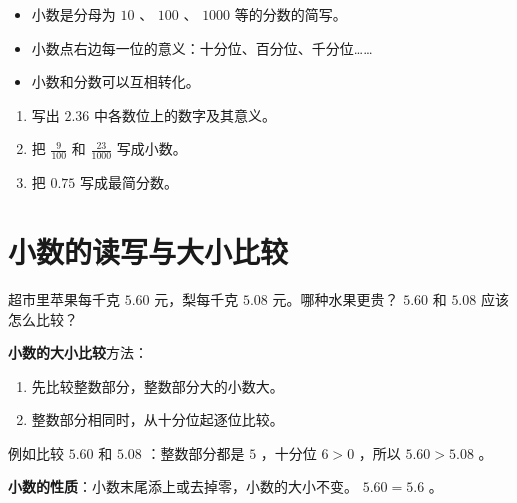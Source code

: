 \begin{keytakeaway}


\begin{itemize}
  \item 小数是分母为 $10$ 、 $100$ 、 $1000$ 等的分数的简写。
  \item 小数点右边每一位的意义：十分位、百分位、千分位……
  \item 小数和分数可以互相转化。
\end{itemize}


\end{keytakeaway}

\begin{practice}


\begin{enumerate}
  \item 写出 $2.36$ 中各数位上的数字及其意义。
  \item 把 $\frac{9}{100}$ 和 $\frac{23}{1000}$ 写成小数。
  \item 把 $0.75$ 写成最简分数。
\end{enumerate}


\end{practice}

\section*{小数的读写与大小比较}


\begin{explore}


超市里苹果每千克 $5.60$ 元，梨每千克 $5.08$ 元。哪种水果更贵？ $5.60$ 和 $5.08$ 应该怎么比较？

\end{explore}

\begin{understand}


\textbf{小数的大小比较}方法：
\begin{enumerate}
  \item 先比较整数部分，整数部分大的小数大。
  \item 整数部分相同时，从十分位起逐位比较。
\end{enumerate}


例如比较 $5.60$ 和 $5.08$ ：整数部分都是 $5$ ，十分位 $6 > 0$ ，所以 $5.60 > 5.08$ 。

\textbf{小数的性质}：小数末尾添上或去掉零，小数的大小不变。 $5.60 = 5.6$ 。

\end{understand}

